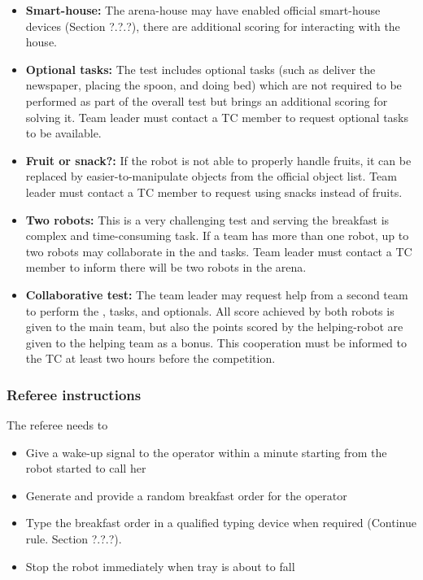 \begin{itemize}
\item \textbf{Smart-house:} The arena-house may have enabled official smart-house devices (Section ?.?.?), there are additional scoring for interacting with the house.

\item \textbf{Optional tasks:} The test includes optional tasks (such as deliver the newspaper, placing the spoon, and doing bed) which are not required to be performed as part of the overall test but brings an additional scoring for solving it. Team leader must contact a TC member to request optional tasks to be available.

\item \textbf{Fruit or snack?:} If the robot is not able to properly handle fruits, it can be replaced by easier-to-manipulate objects from the official object list. Team leader must contact a TC member to request using snacks instead of fruits.

\item \textbf{Two robots:} This is a very challenging test and serving the breakfast is complex and time-consuming task. If a team has more than one robot, up to two robots may collaborate in the  and  tasks. Team leader must contact a TC member to inform there will be two robots in the arena.

\item \textbf{Collaborative test:} The team leader may request help from a second team to perform the ,  tasks, and  optionals. All score achieved by both robots is given to the main team, but also the points scored by the helping-robot are given to the helping team as a bonus. This cooperation must be informed to the TC at least two hours before the competition.
\end{itemize}

\subsubsection{Referee instructions}

The referee needs to
\begin{itemize}
\item Give a wake-up signal to the operator within a minute starting from the robot started to call her
\item Generate and provide a random breakfast order for the operator
\item Type the breakfast order in a qualified typing device when required (Continue rule. Section ?.?.?).
\item Stop the robot immediately when tray is about to fall
\end{itemize}

